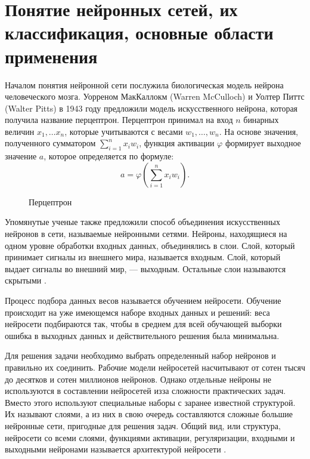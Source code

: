 \chapter{Понятие нейронных сетей, их классификация, основные области применения}
Началом понятия нейронной сети послужила биологическая модель нейрона человеческого мозга.
Уорреном МакКаллокм (Warren McCulloch) и Уолтер Питтс (Walter Pitts) в 1943 году предложили
модель искусственного нейрона, которая получила название перцептрон. Перцептрон принимал на вход $n$ бинарных величин $x_1, \dots x_n$,
которые учитываются с весами $w_1, \dots, w_n$. На основе значения, полученного сумматором $\sum_{i=1}^n x_i w_i$, функция активации
$\varphi$ формирует выходное значение $a$, которое определяется по формуле:
\begin{equation}
    a = \varphi \left( \sum\limits_{i=1}^n x_i w_i \right).
\end{equation}

\begin{figure}[H]
	\caption{Перцептрон}
\end{figure}

Упомянутые ученые также предложили способ объединения искусственных нейронов в сети, называемые нейронными сетями.
Нейроны, находящиеся на одном уровне обработки входных данных, объединялись в слои.
Слой, который принимает сигналы из внешнего мира, называется входным. Слой, который выдает сигналы во внешний мир, —
выходным. Остальные слои называются скрытыми \cite{sozykin}.

Процесс подбора данных весов называется обучением нейросети.
Обучение происходит на уже имеющемся наборе входных данных и
решений: веса нейросети подбираются так, чтобы в среднем для всей
обучающей выборки ошибка в выходных данных и действительного
решения была минимальна.

Для решения задачи необходимо выбрать определенный набор
нейронов и правильно их соединить. Рабочие модели нейросетей
насчитывают от сотен тысяч до десятков и сотен миллионов нейронов.
Однако отдельные нейроны не используются в составлении нейросетей изза сложности практических задач. Вместо этого используют специальные
наборы с заранее известной структурой. Их называют слоями, а из них в
свою очередь составляются сложные большие нейронные сети, пригодные
для решения задач. Общий вид, или структура, нейросети со всеми слоями,
функциями активации, регуляризации, входными и выходными нейронами
называется архитектурой нейросети \cite{cyber_alex}.

